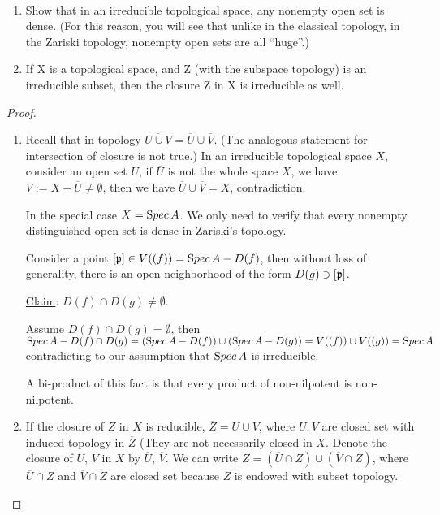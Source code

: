 \documentclass[11pt,fleqn]{book}
\begin{document}
\begin{exr}\ 
\begin{enumerate}[label=(\alph*)]
\item Show that in an irreducible topological space, any nonempty open set is dense. (For this reason, you will see that unlike in the classical topology, in the Zariski topology, nonempty open sets are all “huge”.)
\item If X is a topological space, and Z (with the subspace topology) is an irreducible subset, then the closure Z in X is irreducible as well.
\end{enumerate}
\end{exr}
\begin{proof}
\begin{enumerate}[label=(\alph*)]
\item Recall that in topology $\overline{U\cup V}=\overline{U}\cup \overline{V}$. (The analogous statement for intersection of closure is not true.) In an irreducible topological space $X$, consider an open set $U$, if $\overline{U}$ is not the whole space $X$, we have $V:=X-\overline{U}\neq \emptyset$, then we have $\overline{U}\cup \overline{V}=X$, contradiction.


In the special case $X={\text Spec\,} A$. We only need to verify that every nonempty distinguished open set is dense in Zariski's topology.

Consider a point $[{\mathfrak p}]\in V((f))={\text Spec\,} A-D(f)$, then without loss of generality, there is  an open neighborhood of the form $D(g)\ni[{\mathfrak p}]$. 

\underline{Claim}: $D(f)\cap D(g)\neq \emptyset$.

Assume $D(f)\cap D(g)=\emptyset$, then ${\text Spec\,} A-D(f)\cap D(g)=({\text Spec\,} A-D(f))\cup({\text Spec\,} A-D(g))=V((f))\cup V((g))={\text Spec\,} A$ contradicting to our assumption that ${\text Spec\,} A$ is irreducible.

A bi-product of this fact is that every product of non-nilpotent is non-nilpotent.

 \item If the closure of $Z$ in $X$ is reducible, $\overline{Z}=U\cup V$, where $U,V$ are closed set with induced topology in $\overline{Z}$ (They are not necessarily closed in $X$. Denote the closure of $U$, $V$ in $X$ by $\overline{U}$, $\overline{V}$. We can write $Z=(\overline{U}\cap Z)\cup (\overline{V}\cap Z)$, where $\overline{U}\cap Z$ and $\overline{V}\cap Z$ are closed set because $Z$ is endowed with subset topology.
\end{enumerate}
\end{proof}
\end{document}
